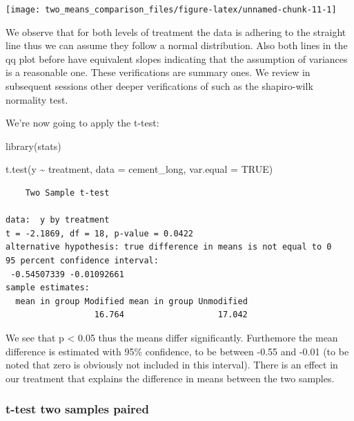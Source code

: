 \documentclass[
]{book}
\newenvironment{Shaded}{\begin{snugshade}}{\end{snugshade}}
\newcommand{\AttributeTok}[1]{\textcolor[rgb]{0.77,0.63,0.00}{#1}}
\newcommand{\ConstantTok}[1]{\textcolor[rgb]{0.00,0.00,0.00}{#1}}
\newcommand{\FunctionTok}[1]{\textcolor[rgb]{0.00,0.00,0.00}{#1}}
\newcommand{\NormalTok}[1]{#1}
\newcommand{\SpecialCharTok}[1]{\textcolor[rgb]{0.00,0.00,0.00}{#1}}
\begin{document}
\texttt{[image: two\_means\_comparison\_files/figure-latex/unnamed-chunk-11-1]}

We observe that for both levels of treatment the data is adhering to the straight line thus we can assume they follow a normal distribution. Also both lines in the qq plot before have equivalent slopes indicating that the assumption of variances is a reasonable one. These verifications are summary ones. We review in subsequent sessions other deeper verifications of such as the shapiro-wilk normality test.

We're now going to apply the t-test:

\begin{Shaded}
\begin{Highlighting}[]
\FunctionTok{library}\NormalTok{(stats)}
\end{Highlighting}
\end{Shaded}

\begin{Shaded}
\begin{Highlighting}[]
\FunctionTok{t.test}\NormalTok{(y }\SpecialCharTok{\textasciitilde{}}\NormalTok{ treatment, }\AttributeTok{data =}\NormalTok{ cement\_long, }\AttributeTok{var.equal =} \ConstantTok{TRUE}\NormalTok{)}
\end{Highlighting}
\end{Shaded}

\begin{verbatim}
	Two Sample t-test

data:  y by treatment
t = -2.1869, df = 18, p-value = 0.0422
alternative hypothesis: true difference in means is not equal to 0
95 percent confidence interval:
 -0.54507339 -0.01092661
sample estimates:
  mean in group Modified mean in group Unmodified 
                  16.764                   17.042 
\end{verbatim}

We see that p \textless{} 0.05 thus the means differ significantly. Furthemore the mean difference is estimated with 95\% confidence, to be between -0.55 and -0.01 (to be noted that zero is obviously not included in this interval). There is an effect in our treatment that explains the difference in means between the two samples.

\hypertarget{t-test-two-samples-paired}{%
\subsubsection{t-test two samples paired}\label{t-test-two-samples-paired}}
\end{document}
